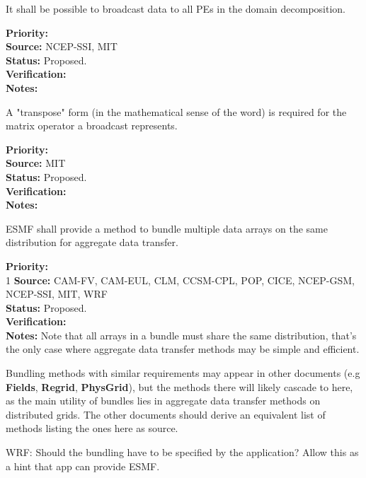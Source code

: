 
It shall be possible to broadcast data to all PEs in the domain decomposition.

\begin{reqlist}
{\bf Priority:} \\ 
{\bf Source:} NCEP-SSI, MIT \\
{\bf Status:} Proposed. \\
{\bf Verification:} \\
{\bf Notes:} 
\end{reqlist}

A "transpose" form (in the mathematical sense of the word) is required
for the matrix operator a broadcast represents.
\begin{reqlist}
{\bf Priority:} \\ 
{\bf Source:}  MIT \\
{\bf Status:} Proposed. \\
{\bf Verification:} \\
{\bf Notes:}
\end{reqlist}


ESMF shall provide a method to bundle multiple data arrays on the same
distribution for aggregate data transfer.

\begin{reqlist}
{\bf Priority:} \\ 1
{\bf Source:} CAM-FV, CAM-EUL, CLM, CCSM-CPL, POP, CICE, NCEP-GSM, NCEP-SSI, MIT, WRF \\
{\bf Status:} Proposed. \\
{\bf Verification:} \\
{\bf Notes:} Note that all arrays in a bundle must share the same
  distribution, that's the only case where aggregate data transfer
  methods may be simple and efficient.
  
  Bundling methods with similar requirements may appear in other
  documents (e.g \textbf{Fields}, \textbf{Regrid}, \textbf{PhysGrid}),
  but the methods there will likely cascade to here, as the main
  utility of bundles lies in aggregate data transfer methods on
  distributed grids. The other documents should derive an equivalent
  list of methods listing the ones here as source.

WRF: Should the bundling have to be specified by the application?  Allow this as a hint that app can provide ESMF.
\end{reqlist}

